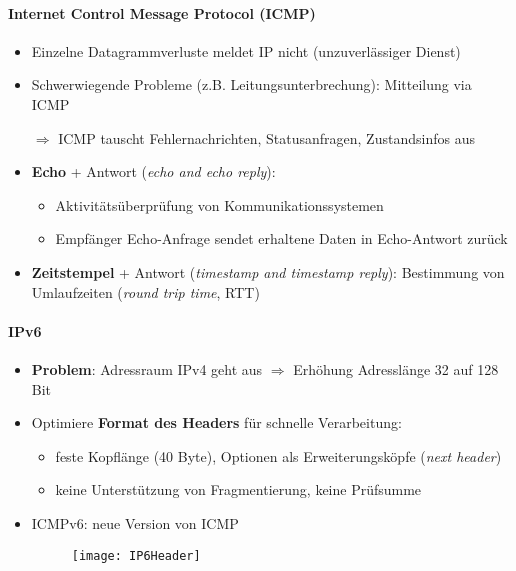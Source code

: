\paragraph{Internet Control Message Protocol (ICMP)}
\begin{itemize}
  \item Einzelne Datagrammverluste meldet IP nicht (unzuverlässiger Dienst)
  \item Schwerwiegende Probleme (z.B. Leitungsunterbrechung): Mitteilung via ICMP
  \item[\( \Rightarrow \)] ICMP tauscht Fehlernachrichten, Statusanfragen, Zustandsinfos aus
  \item \textbf{Echo} + Antwort (\emph{echo and echo reply}):
  \begin{itemize}
    \item Aktivitätsüberprüfung von Kommunikationssystemen
    \item Empfänger Echo-Anfrage sendet erhaltene Daten in Echo-Antwort zurück
  \end{itemize}
  \item \textbf{Zeitstempel} + Antwort (\emph{timestamp and timestamp reply}): Bestimmung von Umlaufzeiten (\emph{round trip time}, RTT)
\end{itemize}

\paragraph{IPv6}
\begin{itemize}
  \item \textbf{Problem}: Adressraum IPv4 geht aus \( \Rightarrow \) Erhöhung Adresslänge 32 auf 128 Bit 
  \item Optimiere \textbf{Format des Headers} für schnelle Verarbeitung:
  \begin{itemize}
    \item feste Kopflänge (40 Byte), Optionen als Erweiterungsköpfe (\emph{next header})
    \item keine Unterstützung von Fragmentierung, keine Prüfsumme
  \end{itemize}
   \item ICMPv6: neue Version von ICMP
    \begin{figure}[H]\centering\texttt{[image: IP6Header]}\end{figure}
\end{itemize}

